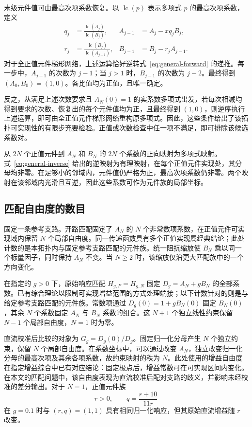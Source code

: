 末级元件值可由最高次项系数恢复。以 $\operatorname{lc}(p)$ 表示多项式 $p$ 的最高次项系数，定义
\begin{equation}\label{eq:general-inverse}
\begin{aligned}
q_j&=\frac{\operatorname{lc}(A_j)}{\operatorname{lc}(B_j)},&
A_{j-1}&=A_j-xq_jB_j,\\
r_j&=\frac{\operatorname{lc}(B_j)}{\operatorname{lc}(A_{j-1})},&
B_{j-1}&=B_j-r_jA_{j-1}.
\end{aligned}
\end{equation}
对于全正值元件梯形网络，上述运算恰好逆转式~\eqref{eq:general-forward} 的递推。每一步中，$A_{j-1}$ 的次数为 $j-1$；当 $j>1$ 时，$B_{j-1}$ 的次数为 $j-2$。最终得到 $(A_0,B_0)=(1,0)$。各比值均为正值，且唯一确定。

反之，从满足上述次数要求且 $A_N(0)=1$ 的实系数多项式出发，若每次相减均得到要求的次数、恢复出的每个元件值均为正，且最终得到 $(1,0)$，则逆序执行上述运算，即可由全正值元件梯形网络重构原多项式。因此，这些条件给出了该拓扑可实现性的有限步充要检验。正值或次数检查中任一项不满足，即可排除该候选系数对。

从 $2N$ 个正值元件到 $A_N$ 和 $B_N$ 的 $2N$ 个系数的正向映射为多项式映射。式~\eqref{eq:general-inverse} 给出的逆映射为有理映射，在每个正值元件实现处，其分母均非零。在足够小的邻域内，元件值仍严格为正，最高次项系数仍非零。两个映射在该邻域内光滑且互逆，因此这些系数可作为元件族的局部坐标。

\subsection{匹配自由度的数目}

固定一条参考支路。开路匹配固定了 $A_N$ 的 $N$ 个非常数项系数，在正值元件可实现域内保留 $N$ 个局部自由度。同一传递函数具有多个正值实现属经典结论\citep{fialkow1951rcladder,fialkow1952rcnetworks}；此处计数的是本拓扑内与固定参考支路匹配的元件族。统一阻抗缩放使 $B_N$ 乘以同一个标量因子，同时保持 $A_N$ 不变。当 $N\geq2$ 时，该缩放仅沿更大匹配族中的一个方向变化。

在指定的 $g>0$ 下，原始响应匹配 $H_{g,P}=H_{g,N}$ 固定 $D_g=A_N+gB_N$ 的全部系数。已有综合理论以限制可实现增益范围的方式处理端接\citep{fialkow1951rcladder,fialkow1952rcnetworks}；以下计数针对的则是与给定参考支路匹配的元件族。常数项通过 $D_g(0)=1+gB_N(0)$ 固定 $B_N(0)$，其余 $N$ 个系数固定 $A_N$ 与 $B_N$ 系数的组合。这 $N+1$ 个独立线性约束保留 $N-1$ 个局部自由度，$N=1$ 时为零。

直流校准后比较的对象为 $G_g=D_g(0)/D_g$。固定归一化分母产生 $N$ 个独立约束，保留 $N$ 个局部自由度。在系数坐标中，可以通过改变 $A_N$，独立改变归一化分母的最高次项及其余各项系数，故约束映射的秩为 $N$。此处使用的增益自由度在指定增益综合中已有对应结论：固定极点后，增益常数可在可实现区间内变化\citep{fialkow1951rcladder,paige1960maximum,wang2017rcladder}。在本文的匹配问题中，该自由度表现为直流校准后配对支路的歧义，并影响未经校准的差分输出。对于 $N=1$，正值元件族
\[
r>0,\qquad q=\frac{r+10}{11r}
\]
在 $g=0.1$ 时与 $(r,q)=(1,1)$ 具有相同归一化响应，但其原始直流增益随 $r$ 改变。

